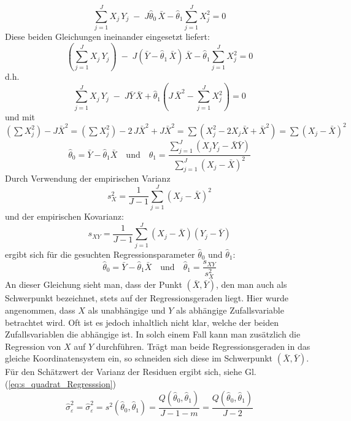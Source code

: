\[
\sum\limits_{j = 1}^J {X_j \, Y_j \; - \; J \hat{\theta}_0 \, \bar {X}} - \hat{\theta}_1 \sum\limits_{j = 1}^J {X_j ^2 = 0}
\]
Diese beiden Gleichungen ineinander eingesetzt liefert:
\[
\left(\sum\limits_{j = 1}^J X_j \, Y_j\right) \; -
\; J (\bar {Y} - \hat{\theta}_1 \, \bar {X}) \, \bar {X} - \hat{\theta}_1 \sum\limits_{j = 1}^J {X_j ^2 = 0}
\]
d.h.
\[
\sum\limits_{j = 1}^J X_j \, Y_j \; - \; J \bar {Y} \, \bar {X} +
\hat{\theta}_1\left( J \, \bar {X}^2 - \sum\limits_{j = 1}^J X_j ^2 \right) = 0
\]
und mit $(\sum X_j^2) - J \bar X^2 = (\sum X_j^2) - 2 \, J \bar X^2  + J \bar X^2 =
\sum(X_j^2 - 2 X_j \bar X  + \bar X^2) = \sum(X_j - \bar X)^2$
\[
\hat{\theta}_0 = \bar {Y} - \hat{\theta}_1 \bar {X} \quad \mathrm{und} \quad
\hat{\theta}_1 = \frac{\sum\limits_{j =
		1}^J {(X_j Y_j - \bar {X}\bar {Y})} }
{\sum\limits_{j = 1}^J {(X_j
		- \bar {X})^2} }
\]
Durch Verwendung der empirischen Varianz
\[
s_X^2 = \frac{1}{J - 1}\sum\limits_{j = 1}^J {(X_j - \bar {X})^2}
\]
\noindent und der empirischen Kovarianz:
\[
s_{XY} = \frac{1}{J - 1}\sum\limits_{j = 1}^J {(X_j - \bar
	{X})(Y_j - \bar {Y})}
\]
\noindent ergibt sich für die gesuchten Regressionsparameter
$\hat{\theta}_0$ und $\hat{\theta}_1 $:
\begin{equation}
\hat{\theta}_0 = \bar {Y} - \hat{\theta}_1 \bar {X} \quad \mathrm{und} \quad
\hat{\theta}_1 = \frac{s_{XY} }{s_X^2 }
\label{eq:Lineare_Regressionskonstanten}
\end{equation}
An dieser Gleichung sieht man, dass der Punkt $(\bar {X},\bar
{Y})$, den man auch als Schwerpunkt bezeichnet, stets auf der
Regressionsgeraden liegt. Hier wurde angenommen, dass $X$
als unabhängige und $Y $ als abhängige
Zufallsvariable betrachtet wird. Oft ist es jedoch inhaltlich
nicht klar, welche der beiden Zufallsvariablen die abh\"{a}ngige
ist. In solch einem Fall kann man zusätzlich die Regression
von $X$ auf $Y$ durchführen. Trägt man beide
Regressionsgeraden in das gleiche Koordinatensystem ein, so
schneiden sich diese im Schwerpunkt $(\bar {X},\bar {Y})$.
Für den Schätzwert der Varianz der Residuen ergibt sich, siehe Gl.(\ref{eq:s_quadrat_Regresssion})
\begin{equation}
\hat\sigma^2_\varepsilon = \hat\sigma_\varepsilon^2 = s^2(\hat{\theta}_0 ,\hat{\theta}_1 ) = \frac{Q(\hat{\theta}_0 ,
	\hat{\theta}_1 )}{J - 1 - m }
= \frac{Q(\hat{\theta}_0 ,
	\hat{\theta}_1 )}{J - 2}
\end{equation}

\newpage
